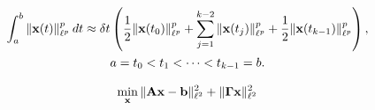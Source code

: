 \documentclass[12 pt]{article}
\begin{document}
\begin{gather*}
    \int_{a}^{b}\|\mathbf{x}(t)\|_{\ell^p}^{p}\:dt
    \approx \delta t\left(
        \frac{1}{2}\|\mathbf{x}(t_0)\|_{\ell^p}^p
        + \sum_{j=1}^{k-2}\|\mathbf{x}(t_j)\|_{\ell^p}^p
        + \frac{1}{2}\|\mathbf{x}(t_{k-1})\|_{\ell^p}^p
    \right),
    \\
    a = t_0 < t_1 < \cdots < t_{k-1} = b.
\end{gather*}



\begin{align*}
    \min_{\mathbf{x}}\|\mathbf{A}\mathbf{x} - \mathbf{b}\|_{\ell^2}^2 + \|\boldsymbol{\Gamma}\mathbf{x}\|_{\ell^2}^2
\end{align*}
\end{document}
